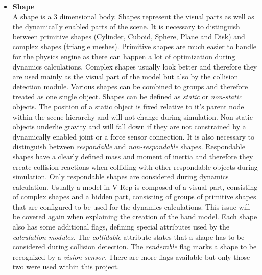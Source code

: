 \begin{itemize}
\item \textbf{Shape} \\
A shape is a 3 dimensional body. Shapes represent the visual parts as well as the dynamically enabled parts of the scene. It is necessary to distinguish between primitive shapes (Cylinder, Cuboid, Sphere, Plane and Disk) and complex shapes (triangle meshes). Primitive shapes are much easier to handle for the physics engine as there can happen a lot of optimization during dynamics calculations. Complex shapes usually look better and therefore they are used mainly as the visual part of the model but also by the collision detection module. Various shapes can be combined to groups and therefore treated as one single object. Shapes can be defined as \emph{static} or \emph{non-static} objects. The position of a static object is fixed relative to it's parent node within the scene hierarchy and will not change during simulation. Non-static objects underlie gravity and will fall down if they are not constrained by a dynamically enabled joint or a force sensor connection. It is also necessary to distinguish between \emph{respondable} and \emph{non-respondable} shapes. Respondable shapes have a clearly defined mass and moment of inertia and therefore they create collision reactions when colliding with other respondable objects during simulation. Only respondable shapes are considered during dynamics calculation. Usually a model in V-Rep is composed of a visual part, consisting of complex shapes and a hidden part, consisting of groups of primitive shapes that are configured to be used for the dynamics calculations. This issue will be covered again when explaining the creation of the hand model. Each shape also has some additional flags, defining special attributes used by the \emph{calculation modules}. The \emph{collidable} attribute states that a shape has to be considered during collision detection. The \emph{renderable} flag marks a shape to be recognized by a \emph{vision sensor}. There are more flags available but only those two were used within this project.


\end{itemize}
